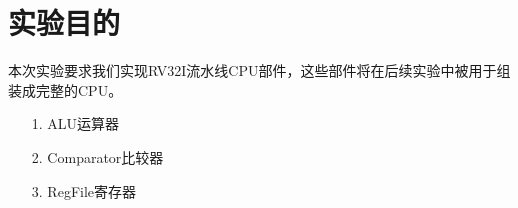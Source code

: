 \section{实验目的}
本次实验要求我们实现RV32I流水线CPU部件，这些部件将在后续实验中被用于组装成完整的CPU。
\begin{itemize}
    \item [1.] ALU运算器
    \item [2.] Comparator比较器
    \item [3.] RegFile寄存器
\end{itemize}    
